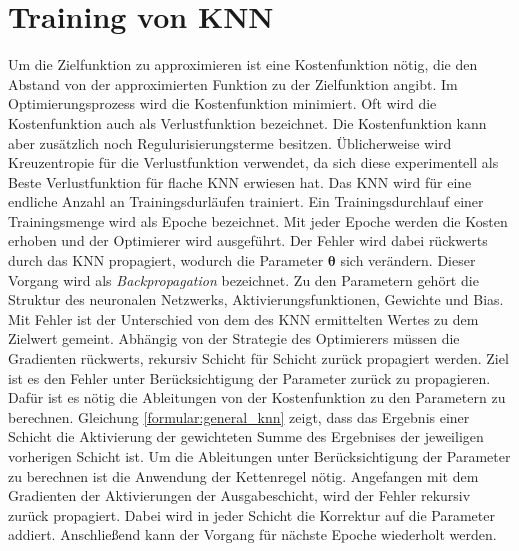 \section{Training von KNN}
Um die Zielfunktion zu approximieren ist eine Kostenfunktion nötig, die den Abstand von der approximierten Funktion zu der Zielfunktion angibt.
Im Optimierungsprozess wird die Kostenfunktion minimiert. Oft wird die Kostenfunktion auch als Verlustfunktion bezeichnet.
Die Kostenfunktion kann aber zusätzlich noch Regulurisierungsterme besitzen.
Üblicherweise wird Kreuzentropie für die Verlustfunktion verwendet, da sich diese experimentell als Beste Verlustfunktion für flache KNN erwiesen hat.
\newline
\newline
Das KNN wird für eine endliche Anzahl an Trainingsdurläufen trainiert.
Ein Trainingsdurchlauf einer Trainingsmenge wird als Epoche bezeichnet.
Mit jeder Epoche werden die Kosten erhoben und der Optimierer wird ausgeführt.
Der Fehler wird dabei rückwerts durch das KNN propagiert, wodurch die Parameter $\boldsymbol\theta$ sich verändern.
Dieser Vorgang wird als \textit{Backpropagation} bezeichnet.
Zu den Parametern gehört die Struktur des neuronalen Netzwerks, Aktivierungsfunktionen, Gewichte und Bias.
Mit Fehler ist der Unterschied von dem des KNN ermittelten Wertes zu dem Zielwert gemeint.
\newline
\newline
Abhängig von der Strategie des Optimierers müssen die Gradienten rückwerts, rekursiv Schicht für Schicht zurück propagiert werden.
Ziel ist es den Fehler unter Berücksichtigung der Parameter zurück zu propagieren.
Dafür ist es nötig die Ableitungen von der Kostenfunktion zu den Parametern zu berechnen.
Gleichung \ref{formular:general_knn} zeigt, dass das Ergebnis einer Schicht die Aktivierung der gewichteten Summe des
Ergebnises der jeweiligen vorherigen Schicht ist.
Um die Ableitungen unter Berücksichtigung der Parameter zu berechnen ist die Anwendung der Kettenregel nötig.
\newline
\newline
Angefangen mit dem Gradienten der Aktivierungen der Ausgabeschicht, wird der Fehler rekursiv zurück propagiert.
Dabei wird in jeder Schicht die Korrektur auf die Parameter addiert.
Anschließend kann der Vorgang für nächste Epoche wiederholt werden.